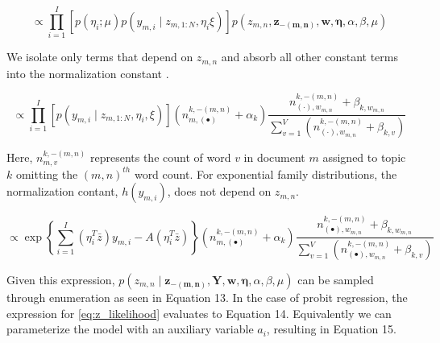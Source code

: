 \documentclass{article}
\begin{document}
\begin{equation}
\propto\prod_{i=1}^{I}\left[p\left(\eta_{i};\mu\right)p\left(y_{m,i}\mid z_{m,1:N},\eta_{i}\xi\right)\right]p\left(z_{m,n},\mathbf{z_{-\left(m,n\right)}},\mathbf{w},\mathbf{\eta},\alpha,\beta,\mu\right)\end{equation}


We isolate only terms that depend on $z_{m,n}$ and absorb all other
constant terms into the normalization constant \citep{Griffiths04}.

\begin{equation}
\propto\prod_{i=1}^{I}\left[p\left(y_{m,i}\mid z_{m,1:N},\eta_{i},\xi\right)\right]\left(n_{m,\left(\bullet\right)}^{k,-\left(m,n\right)}+\alpha_{k}\right)\frac{n_{\left(\cdot\right),w_{m,n}}^{k,-\left(m,n\right)}+\beta_{k,w_{m,n}}}{\sum_{v=1}^{V}\left(n_{\left(\cdot\right),w_{m,n}}^{k,-\left(m,n\right)}+\beta_{k,v}\right)}\end{equation}


Here, $n_{m,v}^{k,-\left(m,n\right)}$ represents the count of word
$v$ in document $m$ assigned to topic $k$ omitting the $(m,n)^{th}$
word count. For exponential family distributions, the normalization
contant, $h(y_{m,i})$, does not depend on $z_{m,n}$.

\begin{equation}
\propto\exp\left\{ \sum_{i=1}^{I}\left(\eta_{i}^{T}\bar{z}\right)y_{m,i}-A\left(\eta_{i}^{T}\bar{z}\right)\right\} \left(n_{m,\left(\bullet\right)}^{k,-\left(m,n\right)}+\alpha_{k}\right)\frac{n_{\left(\bullet\right),w_{m,n}}^{k,-\left(m,n\right)}+\beta_{k,w_{m,n}}}{\sum_{v=1}^{V}\left(n_{\left(\bullet\right),w_{m,n}}^{k,-\left(m,n\right)}+\beta_{k,v}\right)}\label{eq:z_likelihood}\end{equation}


Given this expression, $p\left(z_{m,n}\mid\mathbf{z_{-\left(m,n\right)}},\mathbf{Y},\mathbf{w},\mathbf{\eta},\alpha,\beta,\mu\right)$
can be sampled through enumeration as seen in Equation 13. In the
case of probit regression, the expression for \ref{eq:z_likelihood}
evaluates to Equation 14. Equivalently we can parameterize the model
with an auxiliary variable $a_{i}$, resulting in Equation 15.

\end{document}
